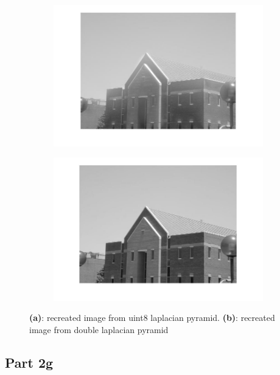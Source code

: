 \documentclass[a4paper]{iacas}
\begin{document}
\begin{figure}[!htbp]
	
	\begin{subfigure}[b]{0.48\textwidth}
		\includegraphics[width=\textwidth]{rec_1_building.jpg}
		\caption{}
		\label{fig:rec1b}
	\end{subfigure}
	\begin{subfigure}[b]{0.48\textwidth}
		\includegraphics[width=\textwidth]{rec_2_building.jpg}
		\caption{}
		\label{fig:rec2b}
	\end{subfigure}
	
	\caption{\textbf{(a)}: recreated image from uint8 laplacian pyramid. \textbf{(b)}: recreated image from double laplacian pyramid}
	
\end{figure}

\subsection{Part 2g}
\end{document}
